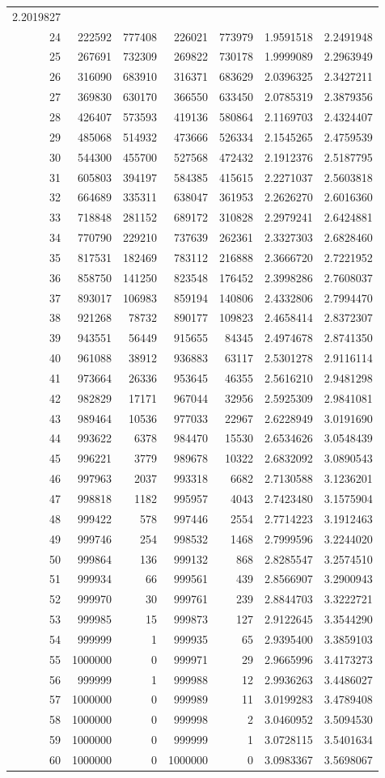 \documentclass[]{article}
\begin{document}
\begin{longtable}[]{@{}rrrrrrr@{}}
2.2019827\tabularnewline
24 & 222592 & 777408 & 226021 & 773979 & 1.9591518 &
2.2491948\tabularnewline
25 & 267691 & 732309 & 269822 & 730178 & 1.9999089 &
2.2963949\tabularnewline
26 & 316090 & 683910 & 316371 & 683629 & 2.0396325 &
2.3427211\tabularnewline
27 & 369830 & 630170 & 366550 & 633450 & 2.0785319 &
2.3879356\tabularnewline
28 & 426407 & 573593 & 419136 & 580864 & 2.1169703 &
2.4324407\tabularnewline
29 & 485068 & 514932 & 473666 & 526334 & 2.1545265 &
2.4759539\tabularnewline
30 & 544300 & 455700 & 527568 & 472432 & 2.1912376 &
2.5187795\tabularnewline
31 & 605803 & 394197 & 584385 & 415615 & 2.2271037 &
2.5603818\tabularnewline
32 & 664689 & 335311 & 638047 & 361953 & 2.2626270 &
2.6016360\tabularnewline
33 & 718848 & 281152 & 689172 & 310828 & 2.2979241 &
2.6424881\tabularnewline
34 & 770790 & 229210 & 737639 & 262361 & 2.3327303 &
2.6828460\tabularnewline
35 & 817531 & 182469 & 783112 & 216888 & 2.3666720 &
2.7221952\tabularnewline
36 & 858750 & 141250 & 823548 & 176452 & 2.3998286 &
2.7608037\tabularnewline
37 & 893017 & 106983 & 859194 & 140806 & 2.4332806 &
2.7994470\tabularnewline
38 & 921268 & 78732 & 890177 & 109823 & 2.4658414 &
2.8372307\tabularnewline
39 & 943551 & 56449 & 915655 & 84345 & 2.4974678 &
2.8741350\tabularnewline
40 & 961088 & 38912 & 936883 & 63117 & 2.5301278 &
2.9116114\tabularnewline
41 & 973664 & 26336 & 953645 & 46355 & 2.5616210 &
2.9481298\tabularnewline
42 & 982829 & 17171 & 967044 & 32956 & 2.5925309 &
2.9841081\tabularnewline
43 & 989464 & 10536 & 977033 & 22967 & 2.6228949 &
3.0191690\tabularnewline
44 & 993622 & 6378 & 984470 & 15530 & 2.6534626 &
3.0548439\tabularnewline
45 & 996221 & 3779 & 989678 & 10322 & 2.6832092 &
3.0890543\tabularnewline
46 & 997963 & 2037 & 993318 & 6682 & 2.7130588 &
3.1236201\tabularnewline
47 & 998818 & 1182 & 995957 & 4043 & 2.7423480 &
3.1575904\tabularnewline
48 & 999422 & 578 & 997446 & 2554 & 2.7714223 & 3.1912463\tabularnewline
49 & 999746 & 254 & 998532 & 1468 & 2.7999596 & 3.2244020\tabularnewline
50 & 999864 & 136 & 999132 & 868 & 2.8285547 & 3.2574510\tabularnewline
51 & 999934 & 66 & 999561 & 439 & 2.8566907 & 3.2900943\tabularnewline
52 & 999970 & 30 & 999761 & 239 & 2.8844703 & 3.3222721\tabularnewline
53 & 999985 & 15 & 999873 & 127 & 2.9122645 & 3.3544290\tabularnewline
54 & 999999 & 1 & 999935 & 65 & 2.9395400 & 3.3859103\tabularnewline
55 & 1000000 & 0 & 999971 & 29 & 2.9665996 & 3.4173273\tabularnewline
56 & 999999 & 1 & 999988 & 12 & 2.9936263 & 3.4486027\tabularnewline
57 & 1000000 & 0 & 999989 & 11 & 3.0199283 & 3.4789408\tabularnewline
58 & 1000000 & 0 & 999998 & 2 & 3.0460952 & 3.5094530\tabularnewline
59 & 1000000 & 0 & 999999 & 1 & 3.0728115 & 3.5401634\tabularnewline
60 & 1000000 & 0 & 1000000 & 0 & 3.0983367 & 3.5698067\tabularnewline
\bottomrule
\end{longtable}
\end{document}
